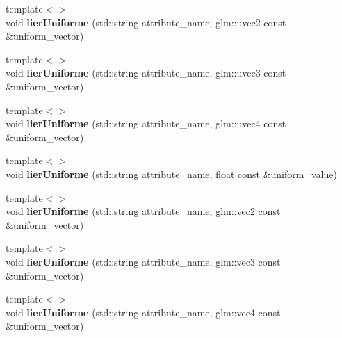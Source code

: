 \begin{DoxyCompactItemize}
\item 
\hypertarget{classopengl_1_1_programme_aa7a84a3b09bd15da89a028737dc06b89}{}{\footnotesize template$<$$>$ }\\void {\bfseries lier\+Uniforme} (std\+::string attribute\+\_\+name, glm\+::uvec2 const \&uniform\+\_\+vector)\label{classopengl_1_1_programme_aa7a84a3b09bd15da89a028737dc06b89}

\item 
\hypertarget{classopengl_1_1_programme_ac65f446e54327ae4cfb002e1d384603d}{}{\footnotesize template$<$$>$ }\\void {\bfseries lier\+Uniforme} (std\+::string attribute\+\_\+name, glm\+::uvec3 const \&uniform\+\_\+vector)\label{classopengl_1_1_programme_ac65f446e54327ae4cfb002e1d384603d}

\item 
\hypertarget{classopengl_1_1_programme_aff769b8420ff80673fffdf3750b03953}{}{\footnotesize template$<$$>$ }\\void {\bfseries lier\+Uniforme} (std\+::string attribute\+\_\+name, glm\+::uvec4 const \&uniform\+\_\+vector)\label{classopengl_1_1_programme_aff769b8420ff80673fffdf3750b03953}

\item 
\hypertarget{classopengl_1_1_programme_a00f2b97cc3b5835a742065d07352c189}{}{\footnotesize template$<$$>$ }\\void {\bfseries lier\+Uniforme} (std\+::string attribute\+\_\+name, float const \&uniform\+\_\+value)\label{classopengl_1_1_programme_a00f2b97cc3b5835a742065d07352c189}

\item 
\hypertarget{classopengl_1_1_programme_ad5359af3f747d2c02de2b1b8cec15a55}{}{\footnotesize template$<$$>$ }\\void {\bfseries lier\+Uniforme} (std\+::string attribute\+\_\+name, glm\+::vec2 const \&uniform\+\_\+vector)\label{classopengl_1_1_programme_ad5359af3f747d2c02de2b1b8cec15a55}

\item 
\hypertarget{classopengl_1_1_programme_aabecc92109a8bbef2c29874b776b5d48}{}{\footnotesize template$<$$>$ }\\void {\bfseries lier\+Uniforme} (std\+::string attribute\+\_\+name, glm\+::vec3 const \&uniform\+\_\+vector)\label{classopengl_1_1_programme_aabecc92109a8bbef2c29874b776b5d48}

\item 
\hypertarget{classopengl_1_1_programme_aaffd5501051901f59115e0a5825d2705}{}{\footnotesize template$<$$>$ }\\void {\bfseries lier\+Uniforme} (std\+::string attribute\+\_\+name, glm\+::vec4 const \&uniform\+\_\+vector)\label{classopengl_1_1_programme_aaffd5501051901f59115e0a5825d2705}


\end{DoxyCompactItemize}
